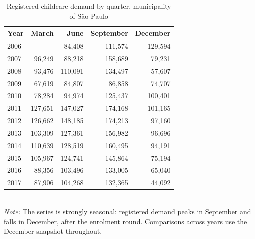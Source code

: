 \begin{table}[htbp]\centering
\caption{Registered childcare demand by quarter, municipality of S\~ao Paulo}
\label{tab:T12}
\small
\setlength{\tabcolsep}{5pt}
\begin{tabular}{lrrrr}
\toprule
Year & March & June & September & December \\
\midrule
2006 & -- & 84,408 & 111,574 & 129,594 \\
2007 & 96,249 & 88,218 & 158,689 & 79,231 \\
2008 & 93,476 & 110,091 & 134,497 & 57,607 \\
2009 & 67,619 & 84,807 & 86,858 & 74,707 \\
2010 & 78,284 & 94,974 & 125,437 & 100,401 \\
2011 & 127,651 & 147,027 & 174,168 & 101,165 \\
2012 & 126,662 & 148,185 & 174,213 & 97,160 \\
2013 & 103,309 & 127,361 & 156,982 & 96,696 \\
2014 & 110,639 & 128,519 & 160,495 & 94,191 \\
2015 & 105,967 & 124,741 & 145,864 & 75,194 \\
2016 & 88,356 & 103,496 & 133,005 & 65,040 \\
2017 & 87,906 & 104,268 & 132,365 & 44,092 \\
\bottomrule
\end{tabular}
\\[3pt]{\footnotesize \textit{Note:} The series is strongly seasonal: registered demand peaks in September and falls in December, after the enrolment round. Comparisons across years use the December snapshot throughout.}
\end{table}
